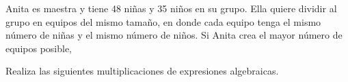 \documentclass[11pt,addpoints]{exam}
\begin{document}

\begin{questions}
    
    \newpage

    
    \newpage
    
    
    
    \question[20] Anita es maestra y tiene 48 niñas y 35 niños en su grupo. Ella quiere dividir al grupo en equipos del mismo tamaño,
    en donde cada equipo tenga el mismo número de niñas y el mismo número de niños. Si Anita crea el mayor número de
    equipos posible,


    \question[20] Realiza las siguientes multiplicaciones de expresiones algebraicas.

    \begin{parts}
        

        
    \end{parts}
\end{questions}
\end{document}
